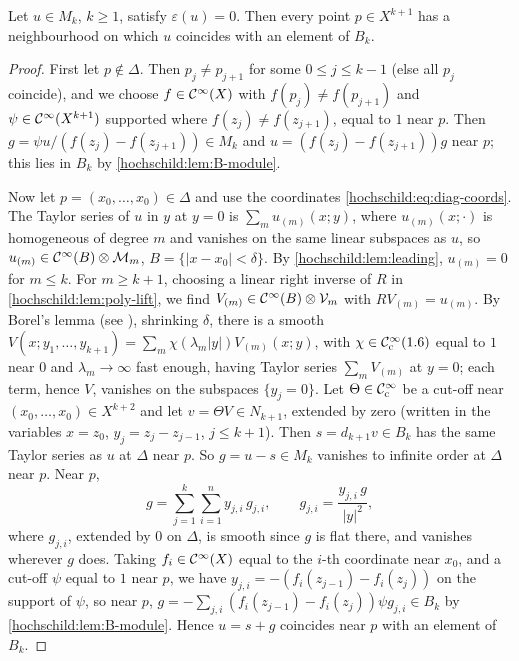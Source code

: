 \begin{lemma}\label{hochschild:lem:local}
Let $u\in M_k$, $k\ge1$, satisfy $\varepsilon(u)=0$. Then every point $p\in
X^{k+1}$ has a neighbourhood on which $u$ coincides with an element of $B_k$.
\end{lemma}
\begin{proof}
First let $p\notin\Delta$. Then $p_j\ne p_{j+1}$ for some $0\le j\le k-1$ (else
all $p_j$ coincide), and we choose $f\in\mathcal{C}^\infty(X)$ with $f(p_j)\ne f(p_{j+1})$
and $\psi\in\mathcal{C}^\infty(X^{k+1})$ supported where $f(z_j)\ne f(z_{j+1})$, equal to
$1$ near $p$. Then $g=\psi u/(f(z_j)-f(z_{j+1}))\in M_k$ and $u=(f(z_j)-f(z_{j+1}))g$
near $p$; this lies in $B_k$ by \cref{hochschild:lem:B-module}.

Now let $p=(x_0,\dots,x_0)\in\Delta$ and use the coordinates
\eqref{hochschild:eq:diag-coords}. The Taylor series of $u$ in $y$ at $y=0$ is
$\sum_mu_{(m)}(x;y)$, where $u_{(m)}(x;\cdot)$ is homogeneous of degree $m$
and vanishes on the same linear subspaces as $u$, so
$u_{(m)}\in\mathcal{C}^\infty(B)\otimes\mathcal M_m$, $B=\{|x-x_0|<\delta\}$. By
\cref{hochschild:lem:leading}, $u_{(m)}=0$ for $m\le k$. For $m\ge k+1$,
choosing a linear right inverse of $R$ in \cref{hochschild:lem:poly-lift}, we
find $V_{(m)}\in\mathcal{C}^\infty(B)\otimes\mathcal V_m$ with $RV_{(m)}=u_{(m)}$. By Borel's
lemma (see \cite[Section~1.2]{Hormander-I}), shrinking $\delta$, there is a smooth
$V(x;y_1,\dots,y_{k+1})=\sum_m\chi(\lambda_m|y|)V_{(m)}(x;y)$, with
$\chi\in\mathcal{C}^\infty_{\mathrm{c}}(1.6)$ equal to $1$ near $0$ and $\lambda_m\to\infty$ fast
enough, having Taylor series $\sum_mV_{(m)}$ at $y=0$; each term, hence $V$,
vanishes on the subspaces $\{y_j=0\}$. Let $\Theta\in\mathcal{C}^\infty_{\mathrm{c}}$ be a cut-off near
$(x_0,\dots,x_0)\in X^{k+2}$ and let $v=\Theta V\in N_{k+1}$, extended by
zero (written in the variables $x=z_0$, $y_j=z_j-z_{j-1}$, $j\le k+1$). Then
$s=d_{k+1}v\in B_k$ has the same Taylor series as $u$ at $\Delta$ near $p$. So
$g=u-s\in M_k$ vanishes to infinite order at $\Delta$ near $p$. Near $p$,
\begin{equation*}
  g=\sum_{j=1}^k\sum_{i=1}^ny_{j,i}\,g_{j,i},\qquad
  g_{j,i}=\frac{y_{j,i}\,g}{|y|^2},
\end{equation*}
where $g_{j,i}$, extended by $0$ on $\Delta$, is smooth since $g$ is flat
there, and vanishes wherever $g$ does. Taking $f_i\in\mathcal{C}^\infty(X)$ equal to the
$i$-th coordinate near $x_0$, and a cut-off $\psi$ equal to $1$ near $p$, we
have $y_{j,i}=-(f_i(z_{j-1})-f_i(z_j))$ on the support of $\psi$, so near $p$,
$g=-\sum_{j,i}(f_i(z_{j-1})-f_i(z_j))\psi g_{j,i}\in B_k$ by
\cref{hochschild:lem:B-module}. Hence $u=s+g$ coincides near $p$ with an
element of $B_k$.
\end{proof}

